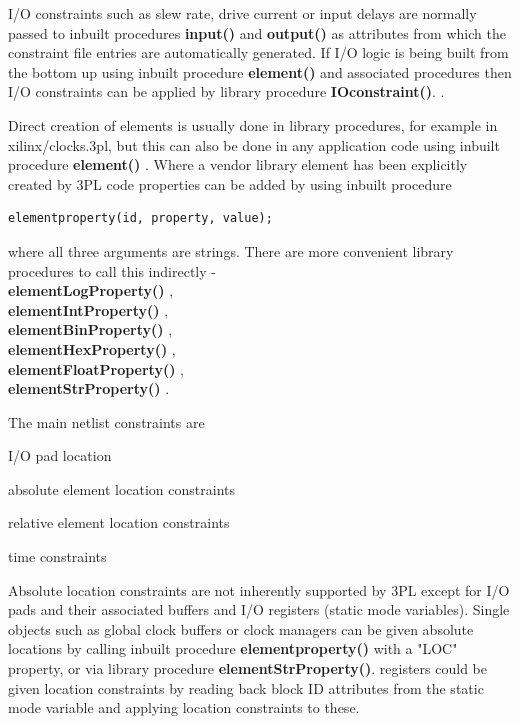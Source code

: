     I/O constraints such as slew rate, drive current or input delays are normally
    passed to inbuilt procedures {\bf input()}  and {\bf
    output()}  as attributes from which the constraint file
    entries are automatically generated. If I/O logic is being built from the bottom
    up using inbuilt procedure {\bf element()} and associated procedures then I/O
    constraints can be applied by library procedure {\bf IOconstraint()}.
    .

    
    Direct creation of elements is
    usually done in library procedures, for example in xilinx/clocks.3pl,
    but this can also be done in any application code using inbuilt procedure
    {\bf element()} .
    Where a vendor library element has been explicitly created by 3PL code
    properties can be added by using inbuilt procedure 
    \begin{lstlisting}[gobble=4, language=threepl]
       elementproperty(id, property, value);
    \end{lstlisting}
    where all three arguments are strings. There are more convenient library
    procedures to call this indirectly - \\
    {\bf elementLogProperty()} , \\
    {\bf elementIntProperty()} , \\
    {\bf elementBinProperty()} , \\
    {\bf elementHexProperty()} , \\
    {\bf elementFloatProperty()} , \\
    {\bf elementStrProperty()} .

    The main netlist constraints are
    \blist
    \item    I/O pad location
    \item    absolute element location constraints
    \item    relative element location constraints
    \item    time constraints
    \blend

    Absolute location constraints are not inherently supported by 3PL except for I/O
    pads and their associated buffers and I/O registers (static mode variables).
    Single objects such as global clock buffers or clock managers can be given
    absolute locations by calling inbuilt procedure {\bf elementproperty()} with a
    "LOC" property, or via library procedure {\bf elementStrProperty()}. registers
    could be given location constraints by reading back block ID attributes from the
    static mode variable and applying location constraints to these.
    
